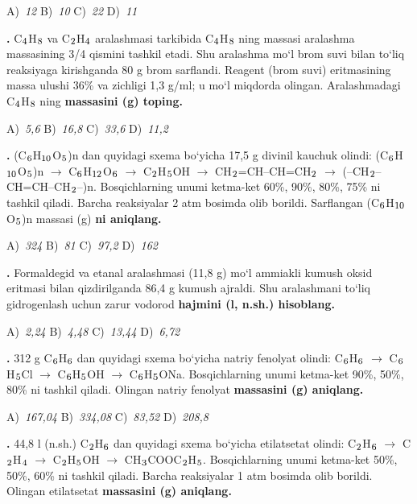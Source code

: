 \documentclass[11pt,a4paper]{article}
\renewcommand{\textsubscript}[1]{\ensuremath{_{\text{\fontsize{8}{8}\selectfont #1}}}}
\newcommand{\qn}[1]{\textbf{\fontsize{11.5}{13}\selectfont #1}}
\newcommand{\qsep}{\par\vspace{13pt}}
\begin{document}
\begin{multicols}{2}
\noindent A)~\textsl{12} \hfill B)~\textsl{10} \hfill C)~\textsl{22} \hfill D)~\textsl{11}\par
\qsep
\noindent\qn{25.} C\textsubscript{4}H\textsubscript{8} va C\textsubscript{2}H\textsubscript{4} aralashmasi tarkibida C\textsubscript{4}H\textsubscript{8} ning massasi aralashma massasining 3/4 qismini tashkil etadi. Shu aralashma mo`l brom suvi bilan to`liq reaksiyaga kirishganda 80 g brom sarflandi. Reagent (brom suvi) eritmasining massa ulushi 36\% va zichligi 1,3 g/ml; u mo`l miqdorda olingan. Aralashmadagi C\textsubscript{4}H\textsubscript{8} ning \textbf{massasini (g) toping.}

\noindent A)~\textsl{5,6} \hfill B)~\textsl{16,8} \hfill C)~\textsl{33,6} \hfill D)~\textsl{11,2}\par
\qsep
\noindent\qn{26.} (C\textsubscript{6}H\textsubscript{10}O\textsubscript{5})n dan quyidagi sxema bo`yicha 17,5 g divinil kauchuk olindi: (C\textsubscript{6}H\textsubscript{10}O\textsubscript{5})n $\to$ C\textsubscript{6}H\textsubscript{12}O\textsubscript{6} $\to$ C\textsubscript{2}H\textsubscript{5}OH $\to$ CH\textsubscript{2}=CH--CH=CH\textsubscript{2} $\to$ (--CH\textsubscript{2}--CH=CH--CH\textsubscript{2}--)n. Bosqichlarning unumi ketma-ket 60\%, 90\%, 80\%, 75\% ni tashkil qiladi. Barcha reaksiyalar 2 atm bosimda olib borildi. Sarflangan (C\textsubscript{6}H\textsubscript{10}O\textsubscript{5})n massasi (g) \textbf{ni aniqlang.}

\noindent A)~\textsl{324} \hfill B)~\textsl{81} \hfill C)~\textsl{97,2} \hfill D)~\textsl{162}\par
\qsep
\noindent\qn{27.} Formaldegid va etanal aralashmasi (11,8 g) mo`l ammiakli kumush oksid eritmasi bilan qizdirilganda 86,4 g kumush ajraldi. Shu aralashmani to`liq gidrogenlash uchun zarur vodorod \textbf{hajmini (l, n.sh.) hisoblang.}

\noindent A)~\textsl{2,24} \hfill B)~\textsl{4,48} \hfill C)~\textsl{13,44} \hfill D)~\textsl{6,72}\par
\qsep
\noindent\qn{28.} 312 g C\textsubscript{6}H\textsubscript{6} dan quyidagi sxema bo`yicha natriy fenolyat olindi: C\textsubscript{6}H\textsubscript{6} $\to$ C\textsubscript{6}H\textsubscript{5}Cl $\to$ C\textsubscript{6}H\textsubscript{5}OH $\to$ C\textsubscript{6}H\textsubscript{5}ONa. Bosqichlarning unumi ketma-ket 90\%, 50\%, 80\% ni tashkil qiladi. Olingan natriy fenolyat \textbf{massasini (g) aniqlang.}

\noindent A)~\textsl{167,04} \hfill B)~\textsl{334,08} \hfill C)~\textsl{83,52} \hfill D)~\textsl{208,8}\par
\qsep
\noindent\qn{29.} 44,8 l (n.sh.) C\textsubscript{2}H\textsubscript{6} dan quyidagi sxema bo`yicha etilatsetat olindi: C\textsubscript{2}H\textsubscript{6} $\to$ C\textsubscript{2}H\textsubscript{4} $\to$ C\textsubscript{2}H\textsubscript{5}OH $\to$ CH\textsubscript{3}COOC\textsubscript{2}H\textsubscript{5}. Bosqichlarning unumi ketma-ket 50\%, 50\%, 60\% ni tashkil qiladi. Barcha reaksiyalar 1 atm bosimda olib borildi. Olingan etilatsetat \textbf{massasini (g) aniqlang.}


\end{multicols}
\end{document}
